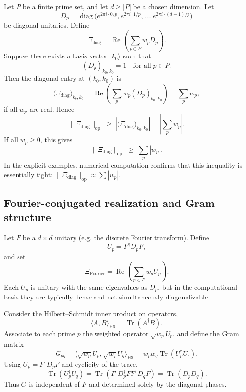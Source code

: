 \documentclass[11pt]{article}
\begin{document}
Let $P$ be a finite prime set, and let $d\ge |P|$ be a chosen dimension. Let
\[
  D_p = \operatorname{diag}\bigl(e^{2\pi i \cdot 0/p},e^{2\pi i \cdot 1/p},
  \dots,e^{2\pi i \cdot (d-1)/p}\bigr)
\]
be diagonal unitaries. Define
\[
  \Xi_{\mathrm{diag}} = \operatorname{Re}\left(\sum_{p\in P} w_p D_p\right).
\]
Suppose there exists a basis vector $|k_0\rangle$ such that
\[
  (D_p)_{k_0,k_0} = 1\quad\text{for all }p\in P.
\]
Then the diagonal entry at $(k_0,k_0)$ is
\[
  \bigl(\Xi_{\mathrm{diag}}\bigr)_{k_0,k_0}
  = \operatorname{Re}\left(\sum_{p} w_p (D_p)_{k_0,k_0}\right)
  = \sum_{p} w_p,
\]
if all $w_p$ are real. Hence
\[
  \|\Xi_{\mathrm{diag}}\|_{\mathrm{op}} \;\geq\;
  \left|\bigl(\Xi_{\mathrm{diag}}\bigr)_{k_0,k_0}\right|
  = \left|\sum_p w_p\right|.
\]
If all $w_p\ge 0$, this gives
\[
  \|\Xi_{\mathrm{diag}}\|_{\mathrm{op}} \;\geq\; \sum_p |w_p|.
\]
In the explicit examples, numerical computation confirms that this inequality is essentially tight: $\|\Xi_{\mathrm{diag}}\|_{\mathrm{op}}\approx \sum |w_p|$.

\subsection{Fourier-conjugated realization and Gram structure}

Let $F$ be a $d\times d$ unitary (e.g. the discrete Fourier transform). Define
\[
  U_p = F^\dagger D_p F,
\]
and set
\[
  \Xi_{\mathrm{Fourier}} = \operatorname{Re}\left(\sum_{p\in P} w_p U_p\right).
\]
Each $U_p$ is unitary with the same eigenvalues as $D_p$, but in the computational basis they are typically dense and not simultaneously diagonalizable.

Consider the Hilbert--Schmidt inner product on operators,
\[
  \langle A,B\rangle_{\mathrm{HS}} = \operatorname{Tr}(A^\dagger B).
\]
Associate to each prime $p$ the weighted operator $\sqrt{w_p} U_p$, and define the Gram matrix
\[
  G_{pq} = \langle \sqrt{w_p} U_p, \sqrt{w_q} U_q\rangle_{\mathrm{HS}}
          = w_p w_q \operatorname{Tr}(U_p^\dagger U_q).
\]
Using $U_p = F^\dagger D_p F$ and cyclicity of the trace,
\[
  \operatorname{Tr}(U_p^\dagger U_q) 
  = \operatorname{Tr}(F^\dagger D_p^\dagger F F^\dagger D_q F)
  = \operatorname{Tr}(D_p^\dagger D_q).
\]
Thus $G$ is independent of $F$ and determined solely by the diagonal phases.
\end{document}
